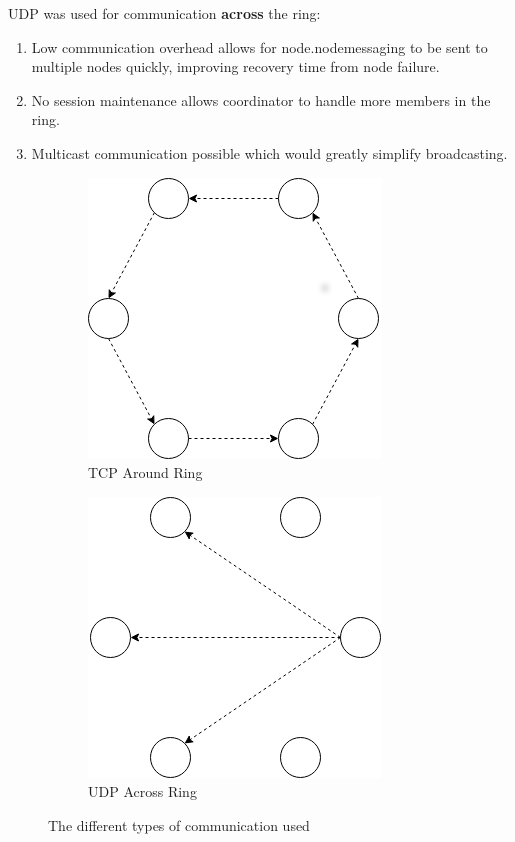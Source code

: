 \documentclass[12pt]{article}
\begin{document}
\noindent UDP was used for communication \textbf{across} the ring: 
\begin{enumerate}
    \item Low communication overhead allows for node.nodemessaging to be sent to multiple nodes quickly, improving recovery time from node failure.
    \item No session maintenance allows coordinator to handle more members in the ring.
    \item Multicast communication possible which would greatly simplify broadcasting.
\end{enumerate}

\begin{figure}[!h]
\centering
\begin{subfigure}{.5\textwidth}
  \centering
  \includegraphics[width=.6\linewidth]{images/tcp}
  \caption{TCP Around Ring}
  \label{fig:tcp}
\end{subfigure}%
\begin{subfigure}{.5\textwidth}
  \centering
  \includegraphics[width=.6\linewidth]{images/udp}
  \caption{UDP Across Ring}
  \label{fig:udp}
\end{subfigure}
\caption{The different types of communication used}
\label{fig:pattern}
\end{figure}
\end{document}
